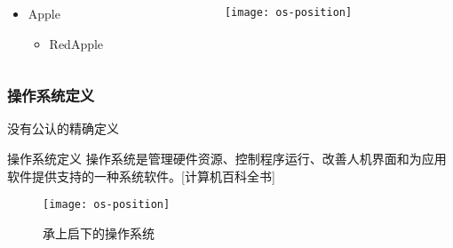 \begin{frame}[t]
	\frametitle{ }
	\begin{columns}[t]
		\begin{column}{.5\textwidth}
			
			\begin{itemize}\Large
				\item Apple
				\begin{itemize}\large
					\item RedApple
					
				\end{itemize}
			\end{itemize}
			
		\end{column}
		
		\begin{column}{.5\textwidth}
			
		\texttt{[image: os-position]}
			
		\end{column}
	\end{columns}
\end{frame}

\begin{frame}[plain]	
	\frametitle{}
	
	
\end{frame}
\begin{frame}[plain]
	
	\frametitle{操作系统定义}
	
	
	没有公认的精确定义 \pause
	
	\begin{block}{操作系统定义}
		操作系统是管理硬件资源、控制程序运行、改善人机界面和为应用软件提供支持的一种系统软件。[计算机百科全书]
	\end{block} \pause
	
	
	\begin{figure}
		\centering
		\texttt{[image: os-position]}
		\caption{承上启下的操作系统}
	\end{figure}
	
\end{frame}


